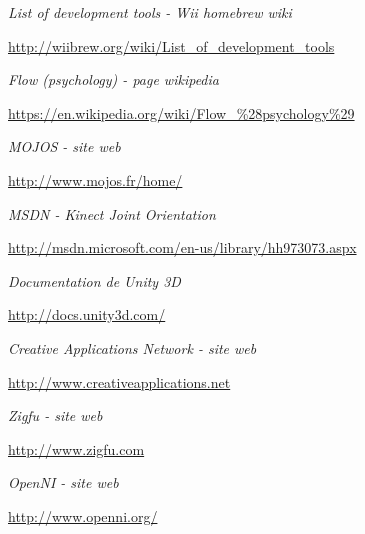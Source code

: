 \begin{thebibliography}{9}
  \emph{List of development tools - Wii homebrew wiki}\\
  \begin{small}
  \url{http://wiibrew.org/wiki/List_of_development_tools}
  \end{small}
  
  \emph{Flow (psychology) - page wikipedia}\\
  \begin{small}
  \url{https://en.wikipedia.org/wiki/Flow_\%28psychology\%29}
  \end{small}
  
  \emph{MOJOS - site web}\\
  \begin{small}
  \url{http://www.mojos.fr/home/}
  \end{small}
  
  \emph{MSDN - Kinect Joint Orientation}\\
  \begin{small}
  \url{http://msdn.microsoft.com/en-us/library/hh973073.aspx}
  \end{small}
  
  \emph{Documentation de Unity 3D}\\
  \begin{small}
  \url{http://docs.unity3d.com/}
  \end{small}

  \emph{Creative Applications Network - site web}\\
  \begin{small}
  \url{http://www.creativeapplications.net}
  \end{small}
  
  \emph{Zigfu - site web}\\
  \begin{small}
  \url{http://www.zigfu.com}
  \end{small}

  \emph{OpenNI - site web}\\
  \begin{small}
  \url{http://www.openni.org/}
  \end{small}
  
\end{thebibliography}
        
